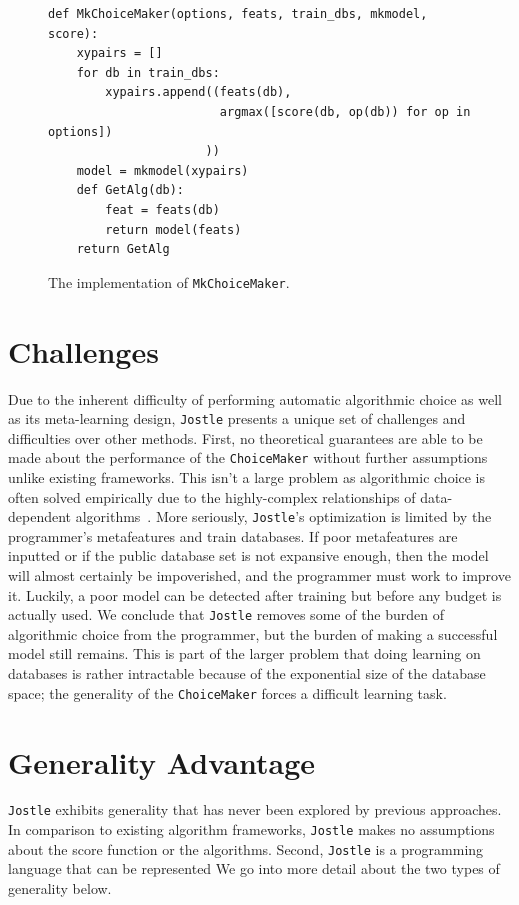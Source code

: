 \documentclass[11pt]{report}
\newcommand{\Jostle}{\texttt{Jostle}}
\renewcommand{\t}[1]{\texttt{#1}}
\begin{document}
\begin{figure}
\begin{lstlisting}[style=MyPythonStyle]
def MkChoiceMaker(options, feats, train_dbs, mkmodel, score):
    xypairs = []
    for db in train_dbs:
        xypairs.append((feats(db), 
                        argmax([score(db, op(db)) for op in options])
                      ))
    model = mkmodel(xypairs)
    def GetAlg(db):
        feat = feats(db)
        return model(feats)
    return GetAlg
\end{lstlisting}
\caption{The implementation of \t{MkChoiceMaker}. }\label{fig:choicemaker}
\end{figure}

\section{Challenges}
Due to the inherent difficulty of performing automatic algorithmic choice as well as its meta-learning design, \Jostle{} presents a unique set of challenges and difficulties over other methods. First, no theoretical guarantees are able to be made about the performance of the \t{ChoiceMaker} without further assumptions unlike existing frameworks. This isn't a large problem as algorithmic choice is often solved empirically due to the highly-complex relationships of data-dependent algorithms~\cite{Hay:2016}. More seriously, \Jostle{}'s optimization is limited by the programmer's metafeatures and train databases. If poor metafeatures are inputted or if the public database set is not expansive enough, then the model will almost certainly be impoverished, and the programmer must work to improve it. Luckily, a poor model can be detected after training but before any budget is actually used. We conclude that \Jostle{} removes some of the burden of algorithmic choice from the programmer, but the burden of making a successful model still remains. This is part of the larger problem that doing learning on databases is rather intractable because of the exponential size of the database space; the generality of the \t{ChoiceMaker} forces a difficult learning task.

\section{Generality Advantage}
\Jostle{} exhibits generality that has never been explored by previous approaches. In comparison to existing algorithm frameworks, \Jostle{} makes no assumptions about the score function or the algorithms. Second, \Jostle{} is a programming language that can be represented  We go into more detail about the two types of generality below.
\end{document}
